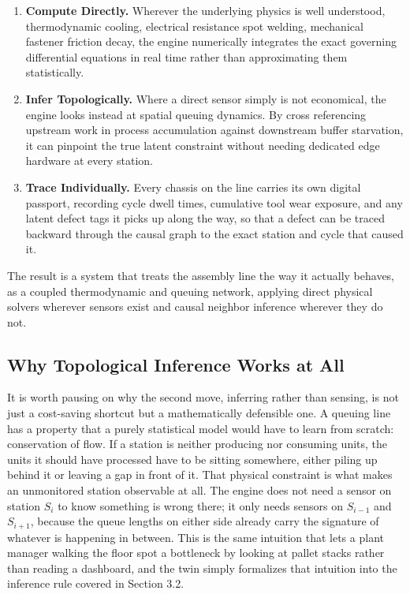 \documentclass[11pt]{article}
\begin{document}
\begin{enumerate}[leftmargin=1.2cm]
    \item \textbf{Compute Directly.} Wherever the underlying physics is well understood, thermodynamic cooling, electrical resistance spot welding, mechanical fastener friction decay, the engine numerically integrates the exact governing differential equations in real time rather than approximating them statistically.
    \item \textbf{Infer Topologically.} Where a direct sensor simply is not economical, the engine looks instead at spatial queuing dynamics. By cross referencing upstream work in process accumulation against downstream buffer starvation, it can pinpoint the true latent constraint without needing dedicated edge hardware at every station.
    \item \textbf{Trace Individually.} Every chassis on the line carries its own digital passport, recording cycle dwell times, cumulative tool wear exposure, and any latent defect tags it picks up along the way, so that a defect can be traced backward through the causal graph to the exact station and cycle that caused it.
\end{enumerate}

The result is a system that treats the assembly line the way it actually behaves, as a coupled thermodynamic and queuing network, applying direct physical solvers wherever sensors exist and causal neighbor inference wherever they do not.

\subsection{Why Topological Inference Works at All}

It is worth pausing on why the second move, inferring rather than sensing, is not just a cost-saving shortcut but a mathematically defensible one. A queuing line has a property that a purely statistical model would have to learn from scratch: conservation of flow. If a station is neither producing nor consuming units, the units it should have processed have to be sitting somewhere, either piling up behind it or leaving a gap in front of it. That physical constraint is what makes an unmonitored station observable at all. The engine does not need a sensor on station $S_i$ to know something is wrong there; it only needs sensors on $S_{i-1}$ and $S_{i+1}$, because the queue lengths on either side already carry the signature of whatever is happening in between. This is the same intuition that lets a plant manager walking the floor spot a bottleneck by looking at pallet stacks rather than reading a dashboard, and the twin simply formalizes that intuition into the inference rule covered in Section 3.2.
\end{document}
